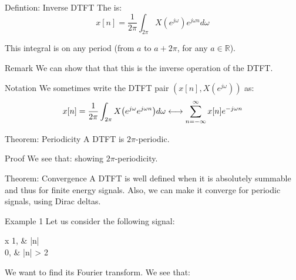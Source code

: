 \documentclass[a4paper]{article}
\begin{document}
\begin{parag}{Defintion: Inverse DTFT}
    The  is: 
    \[x\left[n\right] = \frac{1}{2\pi} \int_{2\pi} X\left(e^{j\omega}\right) e^{j\omega n}d\omega\]

    This integral is on any period (from $a$ to $a + 2\pi$, for any $a \in \mathbb{R}$).

    \begin{subparag}{Remark}
         We can show that that this is the inverse operation of the DTFT.
    \end{subparag}

    \begin{subparag}{Notation}
        We sometimes write the DTFT pair $\left(x\left[n\right], X\left(e^{j\omega}\right)\right)$ as: 
        \[x\left[n\right] = \frac{1}{2\pi} \int_{2\pi} X\left(e^{j\omega} e^{j\omega n}\right) d\omega \dtfourierpair \sum_{n=-\infty}^{\infty} x\left[n\right] e^{-j \omega n}\]
        
    \end{subparag}
    
    
\end{parag}

\begin{parag}{Theorem: Periodicity}
    A DTFT is $2\pi$-periodic.

    \begin{subparag}{Proof}
        We see that: 
        showing $2\pi$-periodicity.
    \end{subparag}
\end{parag}

\begin{parag}{Theorem: Convergence}
    A DTFT is well defined when it is absolutely summable and thus for finite energy signals. Also, we can make it converge for periodic signals, using Dirac deltas.
\end{parag}

\begin{parag}{Example 1}
    Let us consider the following signal:
    \begin{functionbypart}{x\left[n\right]}
        1, & \left|n\right|  \\
        0, & \left|n\right| > 2
    \end{functionbypart}

    We want to find its Fourier transform. We see that: 
\end{parag}
\end{document}
